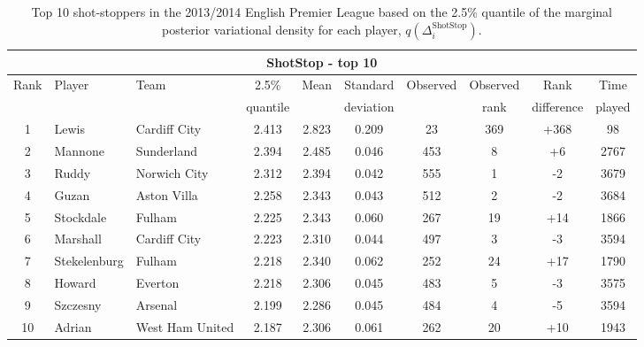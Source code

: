 \documentclass[11pt,a4paper]{article}
\begin{document}
\begin{table}%
\caption{Top 10 shot-stoppers in the 2013/2014 English Premier League based on the 2.5\% quantile of the marginal posterior variational density for each player, $q(\Delta_i^{\textrm{ShotStop}})$.} \label{tableshotstop}
\centering
\footnotesize
\begin{tabular}{cllccccccc}
\hline
\multicolumn{10}{c}{ShotStop - top 10}\\
\hline
\multirow{2}{*}{Rank} & \multirow{2}{*}{Player} &  \multirow{2}{*}{Team} & 2.5\% & \multirow{2}{*}{Mean} & Standard & \multirow{2}{*}{Observed} & Observed & Rank & Time\\
 &  &  & quantile & & deviation &  & rank & difference & played \\
\hline
1 & Lewis & Cardiff City	&	2.413 & 	2.823 & 	0.209 & 	23 & 369	& +368 & 98\\
2 & Mannone & Sunderland &	2.394 & 	2.485 & 	0.046 & 	453 & 8	& +6 & 2767 \\
3 & Ruddy & Norwich City &	2.312 & 	2.394 & 	0.042 & 	555 & 1	& -2 & 3679\\	
4 & Guzan & Aston Villa &	2.258 & 	2.343 & 	0.043 & 	512 & 2	& -2 & 3684\\
5 & Stockdale & Fulham	& 	2.225  &	2.343  &	0.060  &	267 & 19	& +14 & 1866\\ 
6 & Marshall 	& Cardiff City &	2.223  &	2.310  &	0.044 & 	497 & 3	& -3 & 3594\\ 	
7 & Stekelenburg & Fulham &	2.218  &	2.340 & 	0.062 & 	252 & 24	& +17 & 1790\\ 	
8 & Howard  & Everton &	2.218 & 	2.306 & 	0.045 & 	483 & 5	& -3 & 3575\\	
9 & Szczesny & Arsenal & 	2.199  &	2.286  &	0.045 & 	484 & 4	& -5 & 3594\\ 	
10 & Adrian & West Ham United	&	2.187 & 	2.306 & 	0.061 & 	262 & 20	& +10 & 1943\\	
\hline
\end{tabular}
\end{table}
\end{document}
